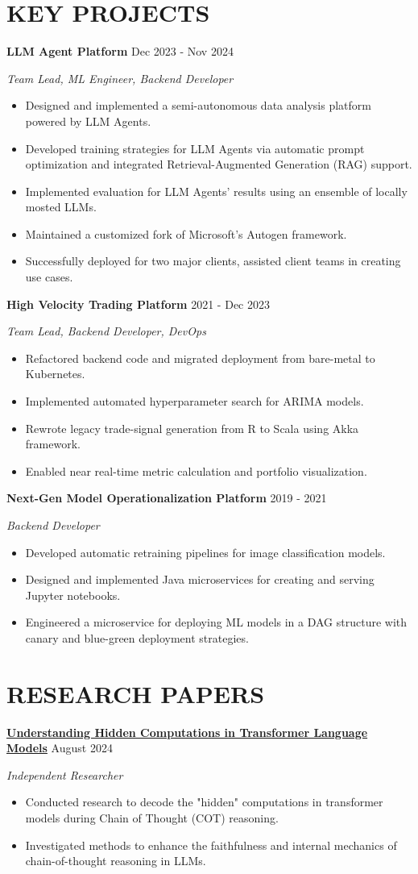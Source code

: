 \documentclass[fontsize=11pt]{article}
\newcommand{\sepspace}{\vspace*{1em}}
\newcommand{\NewPart}[1]{\section*{\uppercase{#1}}}
\newcommand{\ProjectEntry}[4]{
    \noindent \textbf{#1} \hfill {#2} \par
    \noindent \textit{#3} \par
    \noindent \small #4
    \normalsize \par}
\begin{document}
\NewPart{KEY PROJECTS}

\ProjectEntry{LLM Agent Platform}{Dec 2023 - Nov 2024}{Team Lead, ML Engineer, Backend Developer}
{%
\begin{itemize}
\item Designed and implemented a semi-autonomous data analysis platform powered by LLM Agents.
\item Developed training strategies for LLM Agents via automatic prompt optimization and integrated Retrieval-Augmented Generation (RAG) support.
\item Implemented evaluation for LLM Agents' results using an ensemble of locally mosted LLMs.
\item Maintained a customized fork of Microsoft's Autogen framework.
\item Successfully deployed for two major clients, assisted client teams in creating use cases.
\end{itemize}}

\newpage
\ProjectEntry{High Velocity Trading Platform}{2021 - Dec 2023}{Team Lead, Backend Developer, DevOps}
{%
\begin{itemize}
\item Refactored backend code and migrated deployment from bare-metal to Kubernetes.
\item Implemented automated hyperparameter search for ARIMA models.
\item Rewrote legacy trade-signal generation from R to Scala using Akka framework.
\item Enabled near real-time metric calculation and portfolio visualization.
\end{itemize}}

\sepspace
\ProjectEntry{Next-Gen Model Operationalization Platform}{2019 - 2021}{Backend Developer}
{%
\begin{itemize}
\item Developed automatic retraining pipelines for image classification models.
\item Designed and implemented Java microservices for creating and serving Jupyter notebooks.
\item Engineered a microservice for deploying ML models in a DAG structure with canary and blue-green deployment strategies.
\end{itemize}}

\NewPart{RESEARCH PAPERS}

\ProjectEntry{\href{https://arxiv.org/html/2412.04537}{Understanding Hidden Computations in Transformer Language Models}}{August 2024}{Independent Researcher}
{%
\begin{itemize}
\item Conducted research to decode the "hidden" computations in transformer models during Chain of Thought (COT) reasoning.
\item Investigated methods to enhance the faithfulness and internal mechanics of chain-of-thought reasoning in LLMs.
\end{itemize}}
\end{document}
